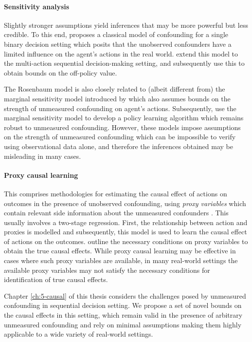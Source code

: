 \paragraph{Sensitivity analysis}
Slightly stronger assumptions yield inferences that may be more powerful but less credible. To this end, \cite{rosenbaum2002observational} proposes a classical model of confounding for a single binary decision setting which posits that the unobserved confounders have a limited influence on the agent's actions in the real world.  \cite{namkoong2020offpolicy} extend this model to the multi-action sequential decision-making setting, and subsequently use this to obtain bounds on the off-policy value.

The Rosenbaum model is also closely related to (albeit different from) the marginal sensitivity model introduced by \cite{tan2006distributional} which also assumes bounds on the strength of unmeasured confounding on agent's actions. Subsequently, \cite{kallus2020minimax} use the marginal sensitivity model to develop a policy learning algorithm which remains robust to unmeasured confounding. However, these models impose assumptions on the strength of unmeasured confounding which can be impossible to verify using observational data alone, and therefore the inferences obtained may be misleading in many cases. 

\paragraph{Proxy causal learning}
This comprises methodologies for estimating the causal effect of actions on outcomes in the presence of unobserved confounding, using \emph{proxy variables} which contain relevant side information about the unmeasured confounders \citep{xu2021deep, tchetgen2020introduction, xu2024kernel}. This usually involves a two-stage regression. First, the relationship between action and proxies is modelled and subsequently, this model is used to learn the causal effect of actions on the outcomes. \cite{kuroki2014measurement} outline the necessary conditions on proxy variables to obtain the true causal effects. While proxy causal learning may be effective in cases where such proxy variables are available, in many real-world settings the available proxy variables may not satisfy the necessary conditions for identification of true causal effects.

Chapter \ref{ch:5-causal} of this thesis considers the challenges posed by unmeasured confounding in sequential decision setting. We propose a set of novel bounds on the causal effects in this setting, which remain valid in the presence of arbitrary unmeasured confounding and rely on minimal assumptions making them highly applicable to a wide variety of real-world settings. 



